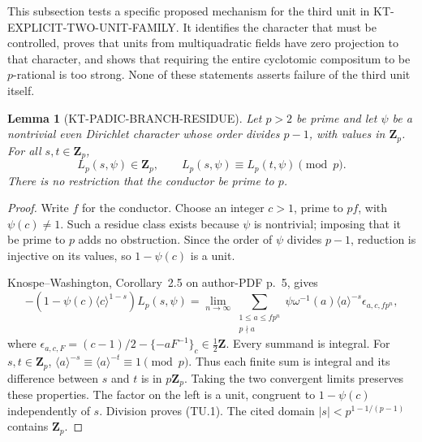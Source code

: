 \documentclass[11pt,a4paper]{article}
\newtheorem{lemma}[theorem]{Lemma}
\theoremstyle{definition}
\begin{document}
This subsection tests a specific proposed mechanism for the third unit in
KT-EXPLICIT-TWO-UNIT-FAMILY.  It identifies the character that must be
controlled, proves that units from multiquadratic fields have zero
projection to that character, and shows that requiring the entire
cyclotomic compositum to be $p$-rational is too strong.  None of these
statements asserts failure of the third unit itself.

\begin{lemma}[KT-PADIC-BRANCH-RESIDUE]
Let $p>2$ be prime and let $\psi$ be a nontrivial even Dirichlet
character whose order divides $p-1$, with values in $\mathbf Z_p$.
For all $s,t\in\mathbf Z_p$,
\[
 L_p(s,\psi)\in\mathbf Z_p,\qquad
 L_p(s,\psi)\equiv L_p(t,\psi)\pmod p.                 \tag{TU.1}
\]
There is no restriction that the conductor be prime to $p$.
\end{lemma}
\begin{proof}
Write $f$ for the conductor.  Choose an integer $c>1$, prime to $pf$,
with $\psi(c)\ne1$.  Such a residue class exists because $\psi$ is
nontrivial; imposing that it be prime to $p$ adds no obstruction.
Since the order of $\psi$ divides $p-1$, reduction is injective on its
values, so $1-\psi(c)$ is a unit.

Knospe--Washington, Corollary~2.5 on author-PDF p.~5, gives
\[
 -(1-\psi(c)\langle c\rangle^{1-s})L_p(s,\psi)
 =\lim_{n\to\infty}\sum_{\substack{1\le a\le fp^n\\p\nmid a}}
     \psi\omega^{-1}(a)\langle a\rangle^{-s}
     \epsilon_{a,c,fp^n},                                  \tag{TU.2}
\]
where
$\epsilon_{a,c,F}=(c-1)/2-\{-aF^{-1}\}_c\in\tfrac12\mathbf Z$.
Every summand is integral.  For $s,t\in\mathbf Z_p$,
$\langle a\rangle^{-s}\equiv\langle a\rangle^{-t}\equiv1\pmod p$.
Thus each finite sum is integral and its difference between $s$ and
$t$ is in $p\mathbf Z_p$.  Taking the two convergent limits preserves
these properties.  The factor on the left is a unit, congruent to
$1-\psi(c)$ independently of $s$.  Division proves (TU.1).
The cited domain $|s|<p^{1-1/(p-1)}$ contains $\mathbf Z_p$.
\end{proof}
\end{document}
